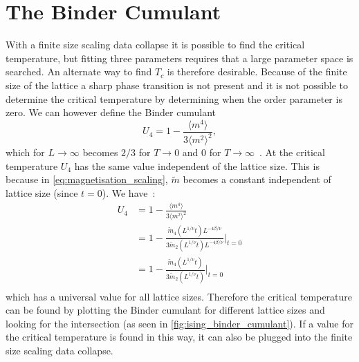 \documentclass[11pt, a4paper]{report} %
\begin{document}
\section{The Binder Cumulant}
With a finite size scaling data collapse it is possible to find the critical temperature, but fitting three parameters requires that a large parameter space is searched.
An alternate way to find \(T_c\) is therefore desirable.
Because of the finite size of the lattice a sharp phase transition is not present and it is not possible to determine the critical temperature by determining when the order parameter is zero.
We can however define the Binder cumulant~\cite{binder:1981b}
\begin{equation}
	U_4 = 1 - \frac{\langle m^4 \rangle}{3 \langle m^2 \rangle^2},
\end{equation}
which for \(L \to \infty\) becomes \(2/3\) for \(T \to 0\) and 0 for \(T \to \infty\)~\cite{landau:2015}.
At the critical temperature \(U_4\) has the same value independent of the lattice size.
This is because in \cref{eq:magnetisation_scaling}, \(\widetilde{m}\) becomes a constant independent of lattice size (since \(t=0\)).
We have~\cite{corboz}:
\begin{align}
	U_4 &= 1 - \frac{\langle m^4 \rangle}{3 \langle m^2 \rangle^2}\\
	&=1 - \frac{ \widetilde{m}_4(L^{1/\nu}t) L^{-4\beta/\nu} }{3 \widetilde{m}_2(L^{1/\nu}t) L^{-4\beta/\nu}}\Bigg|_{t=0} \\
	&=1 - \frac{ \widetilde{m}_4(L^{1/\nu}t) }{3 \widetilde{m}_2(L^{1/\nu}t) }\Bigg|_{t=0} \\
\end{align}
which has a universal value for all lattice sizes.
Therefore the critical temperature can be found by plotting the Binder cumulant for different lattice sizes and looking for the intersection (as seen in \cref{fig:ising_binder_cumulant}).
If a value for the critical temperature is found in this way, it can also be plugged into the finite size scaling data collapse.
\end{document}
